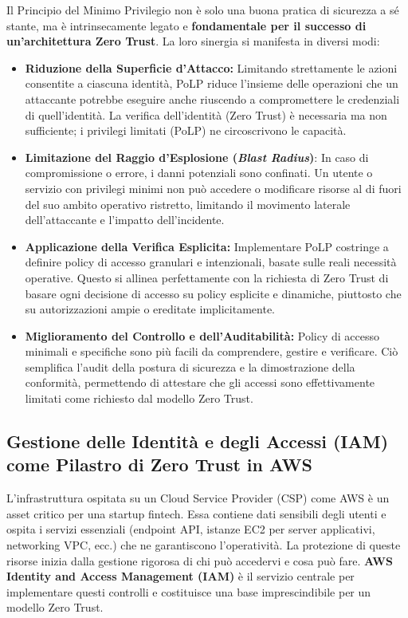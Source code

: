 Il Principio del Minimo Privilegio non è solo una buona pratica di sicurezza a sé stante, ma è intrinsecamente legato e \textbf{fondamentale per il successo di un'architettura Zero Trust}. La loro sinergia si manifesta in diversi modi:

\begin{itemize}
    \item \textbf{Riduzione della Superficie d'Attacco:} Limitando strettamente le azioni consentite a ciascuna identità, PoLP riduce l'insieme delle operazioni che un attaccante potrebbe eseguire anche riuscendo a compromettere le credenziali di quell'identità. La verifica dell'identità (Zero Trust) è necessaria ma non sufficiente; i privilegi limitati (PoLP) ne circoscrivono le capacità.
    \item \textbf{Limitazione del Raggio d'Esplosione (\textit{Blast Radius})}: In caso di compromissione o errore, i danni potenziali sono confinati. Un utente o servizio con privilegi minimi non può accedere o modificare risorse al di fuori del suo ambito operativo ristretto, limitando il movimento laterale dell'attaccante e l'impatto dell'incidente.
    \item \textbf{Applicazione della Verifica Esplicita:} Implementare PoLP costringe a definire policy di accesso granulari e intenzionali, basate sulle reali necessità operative. Questo si allinea perfettamente con la richiesta di Zero Trust di basare ogni decisione di accesso su policy esplicite e dinamiche, piuttosto che su autorizzazioni ampie o ereditate implicitamente.
    \item \textbf{Miglioramento del Controllo e dell'Auditabilità:} Policy di accesso minimali e specifiche sono più facili da comprendere, gestire e verificare. Ciò semplifica l'audit della postura di sicurezza e la dimostrazione della conformità, permettendo di attestare che gli accessi sono effettivamente limitati come richiesto dal modello Zero Trust.
\end{itemize}
\subsection{Gestione delle Identità e degli Accessi (IAM) come Pilastro di Zero Trust in AWS}
\label{subsec:iam-zero-trust}

L'infrastruttura ospitata su un Cloud Service Provider (CSP) come AWS è un asset critico per una startup fintech. Essa contiene dati sensibili degli utenti e ospita i servizi essenziali (endpoint API, istanze EC2 per server applicativi, networking VPC, ecc.) che ne garantiscono l'operatività. La protezione di queste risorse inizia dalla gestione rigorosa di chi può accedervi e cosa può fare. \textbf{AWS Identity and Access Management (IAM)} è il servizio centrale per implementare questi controlli e costituisce una base imprescindibile per un modello Zero Trust.

